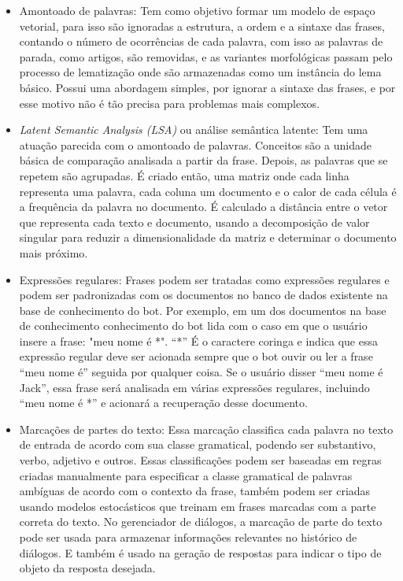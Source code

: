 \documentclass[
	12pt,				%
	oneside,
	a4paper,			%
	english,			%
	french,				%
	spanish,			%
	brazil				%
	]{abntex2}
\begin{document}
\begin{itemize}
	\item Amontoado de palavras: Tem como objetivo formar um modelo de espaço vetorial, para isso são ignoradas a estrutura, a ordem e a sintaxe das frases, contando o número de ocorrências de cada palavra, com isso as palavras de parada, como artigos, são removidas, e as variantes morfológicas passam pelo processo de lematização onde são armazenadas como um instância do lema básico. Possui uma abordagem simples, por ignorar a sintaxe das frases, e por esse motivo não é tão precisa para problemas mais complexos.
	\item \emph{Latent Semantic Analysis (LSA)} ou análise semântica latente: Tem uma atuação parecida com o amontoado de palavras. Conceitos são a unidade básica de comparação analisada a partir da frase. Depois, as palavras que se repetem são agrupadas. É criado então, uma matriz onde cada linha representa uma palavra, cada coluna um documento e o calor de cada célula é a frequência da palavra no documento. É calculado a distância entre o vetor que representa cada texto e documento, usando a decomposição de valor singular para reduzir a dimensionalidade da matriz e determinar o documento mais próximo.
	\item Expressões regulares: Frases podem ser tratadas como expressões regulares e podem ser padronizadas com os documentos no banco de dados existente na base de conhecimento do bot. Por exemplo, em um dos documentos na base de conhecimento conhecimento do bot lida com o caso em que o usuário insere a frase: "meu nome é *". “*” É o caractere coringa e indica que essa expressão regular deve ser acionada sempre que o bot ouvir ou ler a frase “meu nome é” seguida por qualquer coisa. Se o usuário disser “meu nome é Jack”, essa frase será analisada em várias expressões regulares, incluindo “meu nome é *” e acionará a recuperação desse documento. 
	\item Marcações de partes do texto: Essa marcação classifica cada palavra no texto de entrada de acordo com sua classe gramatical, podendo ser substantivo, verbo, adjetivo e outros. Essas classificações podem ser baseadas em regras criadas manualmente para especificar a classe gramatical de palavras ambíguas de acordo com o contexto da frase, também podem ser criadas usando modelos estocásticos que treinam em frases marcadas com a parte correta do texto. No gerenciador de diálogos, a marcação de parte do texto pode ser usada para armazenar informações relevantes no histórico de diálogos. E também é usado na geração de respostas para indicar o tipo de objeto da resposta desejada. 

\end{itemize}
\end{document}
